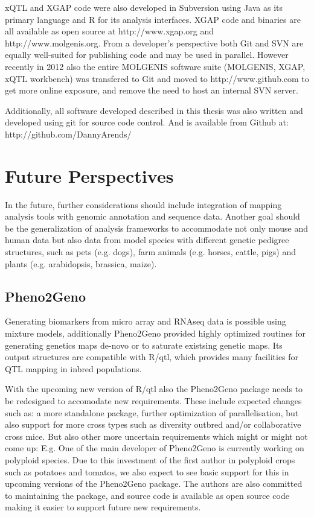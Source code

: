 xQTL and XGAP code were also developed in Subversion using Java as its primary language and 
R for its analysis interfaces. XGAP code and binaries are all available as open source at
http://www.xgap.org and http://www.molgenis.org. From a developer's perspective both Git and
SVN are equally well-suited for publishing code and may be used in parallel. However recently 
in 2012 also the entire MOLGENIS software suite (MOLGENIS, XGAP, xQTL workbench) was transfered 
to Git and moved to http://www.github.com to get more online exposure, and remove the need 
to host an internal SVN server.

Additionally, all software developed described in this thesis was also written and developed 
using git for source code control. And is available from Github at:
http://github.com/DannyArends/

\section*{Future Perspectives}
In the future, further considerations should include integration of mapping analysis tools 
with genomic annotation and sequence data. Another goal should be the generalization of 
analysis frameworks to accommodate not only mouse and human data but also data from model 
species with different genetic pedigree structures, such as pets (e.g. dogs), farm animals
(e.g. horses, cattle, pigs) and plants (e.g. arabidopsis, brassica, maize). 

\subsection*{Pheno2Geno}
Generating biomarkers from micro array and RNAseq data is possible using mixture models, 
additionally Pheno2Geno provided highly optimized routines for generating genetics maps 
de-novo or to saturate existsing genetic maps. Its output structures are compatible with 
R/qtl, which provides many facilities for QTL mapping in inbred populations.

With the upcoming new version of R/qtl also the Pheno2Geno package needs to be redesigned 
to accomodate new requirements. These include expected changes such as: a more standalone package, 
further optimization of parallelisation, but also support for more cross types such as 
diversity outbred and/or collaborative cross mice. But also other more uncertain requirements 
which might or might not come up: E.g. One of the main developer of Pheno2Geno is currently working 
on polyploid species. Due to this investment of the first author in polyploid crops such as 
potatoes and tomatos, we also expect to see basic support for this in upcoming versions of 
the Pheno2Geno package. The authors are also committed to maintaining the package, and source 
code is available as open source code making it easier to support future new requirements.

